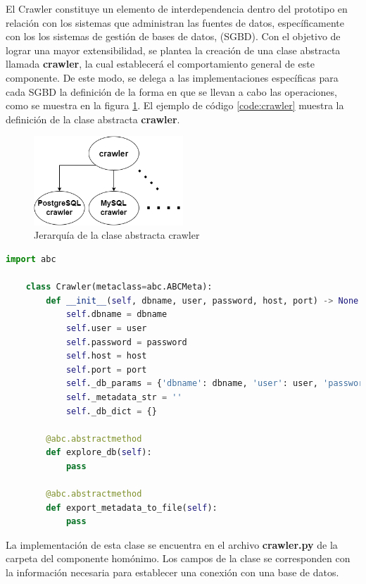 El Crawler constituye un elemento de interdependencia dentro del prototipo en relación con los sistemas 
que administran las fuentes de datos, específicamente con los los sistemas de gestión de bases de datos, (SGBD). 
Con el objetivo de lograr una 
mayor extensibilidad, se plantea la creación de una clase abstracta llamada \textbf{crawler}, la cual establecerá 
el comportamiento general de este componente. De este modo, se delega a las implementaciones específicas para cada 
SGBD la definición de la forma en que se llevan a cabo las operaciones, como se muestra en la figura \ref{fig:crawler}. 
El ejemplo de código \ref{code:crawler} muestra la definición de la clase abstracta \textbf{crawler}.

\begin{figure}[H]
    \centering
    \includegraphics[width=0.5\textwidth]{Graphics/crawler_class.drawio.png}
    \caption{Jerarquía de la clase abstracta crawler}
    \label{fig:crawler}
\end{figure}

\begin{lstlisting}[label={code:crawler}, caption={Definición de la clase abstracta crawler}, language={python}]
    import abc

    class Crawler(metaclass=abc.ABCMeta):
        def __init__(self, dbname, user, password, host, port) -> None:
            self.dbname = dbname
            self.user = user
            self.password = password
            self.host = host
            self.port = port
            self._db_params = {'dbname': dbname, 'user': user, 'password': password, 'host': host, 'port': port}
            self._metadata_str = ''
            self._db_dict = {}

        @abc.abstractmethod
        def explore_db(self):
            pass
        
        @abc.abstractmethod
        def export_metadata_to_file(self):
            pass

\end{lstlisting}

La implementación de esta clase se encuentra en el archivo \textbf{crawler.py} de la carpeta del componente homónimo. Los 
campos de la clase se corresponden con la información necesaria para establecer una conexión con una base de 
datos. 

